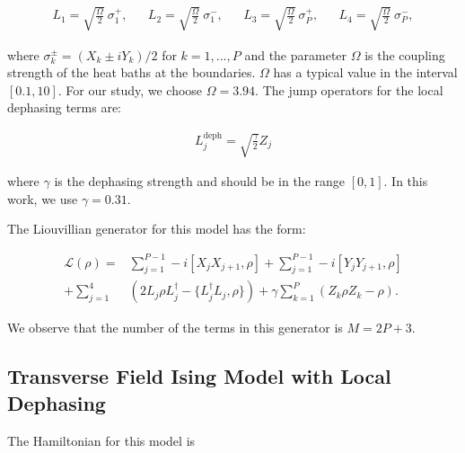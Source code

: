 \documentclass[pdflatex,sn-mathphys-num]{sn-jnl}%
\begin{document}
\begin{align}
L_{1}=\sqrt{\frac{\Omega}{2}} \ \sigma_{1}^{+}, && L_{2}=\sqrt{\frac{\Omega}{2}} \ \sigma_{1}^{-}, && L_{3}=\sqrt{\frac{\Omega}{2}} \ \sigma_{P}^{+}, && L_{4}=\sqrt{\frac{\Omega}{2}} \ \sigma_{P}^{-},
\end{align}

\noindent where $\sigma_{k}^{\pm}=(X_{k}\pm iY_{k})/2$ for $k=1,...,P$ and the parameter $\Omega$ is the coupling strength of the heat baths at the boundaries. $\Omega$ has a typical value in the interval $[0.1, 10]$. For our study, we choose $\Omega=3.94$. The jump operators for the local dephasing terms are:

\begin{align}
L_{j}^{\text{deph}}=\sqrt{\frac{\gamma}{2}}Z_{j}
\end{align}

\noindent where $\gamma$ is the dephasing strength and should be in the range $[0,1]$. In this work, we use $\gamma=0.31$. 

\noindent The Liouvillian generator for this model has the form:

\begin{align}
\mathcal{L}(\rho)=&\sum_{j=1}^{P-1}-i\left[X_{j}X_{j+1},\rho \right]+\sum_{j=1}^{P-1}-i\left[Y_{j}Y_{j+1},\rho \right]\nonumber\\
+\sum_{j=1}^{4}&\left(2L_{j}\rho L_{j}^{\dagger}-\{L_{j}^{\dagger}L_{j},\rho\}\right)+\gamma 
\sum_{k=1}^{P}\left(Z_{k}\rho Z_{k}-\rho\right).
\end{align}

\noindent We observe that the number of the terms in this generator is $M=2P+3$. 

\subsection{Transverse Field Ising Model with Local Dephasing}

 The Hamiltonian for this model is
\end{document}
